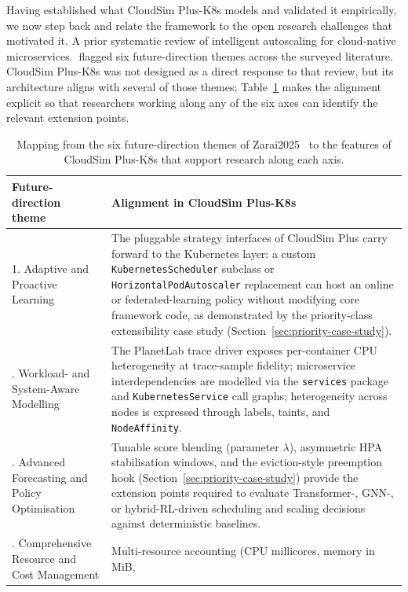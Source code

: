 \documentclass[ASNA,twocolumn]{USG}
\newcommand{\ckm}{CloudSim Plus-K8s\xspace}
\begin{document}
    Having established what \ckm models and validated it empirically, we
    now step back and relate the framework to the open research challenges
    that motivated it. A prior systematic review of intelligent autoscaling
    for cloud-native microservices~\cite{Zarai2025} flagged six
    future-direction themes across the surveyed literature. \ckm was not
    designed as a direct response to that review, but its architecture
    aligns with several of those themes; Table~\ref{tab:zarai-mapping} makes
    the alignment explicit so that researchers working along any of the six
    axes can identify the relevant extension points.

    \begin{table}[!t]
        \centering
        \caption{Mapping from the six future-direction themes of
        Zarai2025~\cite{Zarai2025} to the features of \ckm that
        support research along each axis.\label{tab:zarai-mapping}}
        \begin{tabular*}{\textwidth}{@{\extracolsep{\fill}}p{}p{}@{}}
\toprule
\textbf{Future-direction theme~\cite{Zarai2025}} & \textbf{Alignment in \ckm} \\
\midrule
1. Adaptive and Proactive Learning &
The pluggable strategy interfaces of CloudSim Plus carry forward to
the Kubernetes layer: a custom \texttt{KubernetesScheduler} subclass or
\texttt{HorizontalPodAutoscaler} replacement can host an online or
federated-learning policy without modifying core framework code, as
demonstrated by the priority-class extensibility case study
(Section~\ref{sec:priority-case-study}). \\
\addlinespace
2. Workload- and System-Aware Modelling &
The PlanetLab trace driver exposes per-container CPU heterogeneity at
trace-sample fidelity;
microservice interdependencies are modelled via the
\texttt{services} package and \texttt{KubernetesService} call graphs;
heterogeneity across nodes is expressed through labels, taints, and
\texttt{NodeAffinity}. \\
\addlinespace
3. Advanced Forecasting and Policy Optimisation &
Tunable score blending (parameter $\lambda$),
asymmetric HPA stabilisation windows, and the eviction-style
preemption hook (Section~\ref{sec:priority-case-study}) provide the
extension points required to evaluate Transformer-, GNN-, or
hybrid-RL-driven scheduling and scaling decisions against deterministic
baselines. \\
\addlinespace
4. Comprehensive Resource and Cost Management &
Multi-resource accounting (CPU millicores, memory in MiB,

\end{tabular*}
\end{table}
\end{document}
